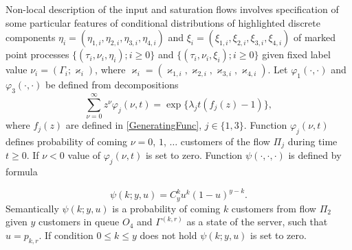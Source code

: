\documentclass[10pt]{article}
\begin{document}
Non-local description of the input and saturation flows involves specification of some particular features of conditional distributions of highlighted discrete components $\eta_i=(\eta_{1,i},\eta_{2,i}, \eta_{3,i}, \eta_{4,i})$ and $\xi_i=(\xi_{1,i}, \xi_{2,i}, \xi_{3,i}, \xi_{4,i})$ of marked point processes $\{(\tau_i, \nu_i, \eta_i); i\geqslant 0\}$ and $\{(\tau_i, \nu_i, \xi_i); i\geqslant 0\}$ given fixed label value $\nu_i = (\Gamma_i;\varkappa_i)$, where $\varkappa_i=(\varkappa_{1,i},\varkappa_{2,i},\varkappa_{3,i},\varkappa_{4,i})$. 
Let $\varphi_1(\cdot,\cdot)$ and $\varphi_3(\cdot,\cdot)$ be defined from decompositions 
\begin{equation*}
\sum_{\nu=0}^{\infty} z^\nu\varphi_j(\nu,t) = \exp\{\lambda_j t (f_j(z)-1)\},
\end{equation*}
where $f_j(z)$ are defined in \eqref{GeneratingFunc}, $j \in \{1,3\}$. Function $\varphi_j(\nu,t)$ defines probability of coming $\nu=0$, $1$, $\ldots$ customers of the flow $\Pi_j$ during time $t \geqslant 0$. If $\nu < 0$ value of $\varphi_j(\nu,t)$ is set to zero. Function $\psi(\cdot,\cdot,\cdot)$ is defined by formula

\begin{equation*}
\psi(k;y,u)=C_y^k u^k (1-u)^{y-k}.	
\end{equation*}
Semantically $\psi(k;y,u)$ is a probability of coming $k$ customers from flow $\Pi_2$ given $y$ customers in queue $O_4$ and $\Gamma^{(k,r)}$ as a state of the server, such that $u=p_{k,r}$. If condition $ 0\leqslant k \leqslant y$ does not hold $\psi(k;y,u)$ is set to zero.
\end{document}
